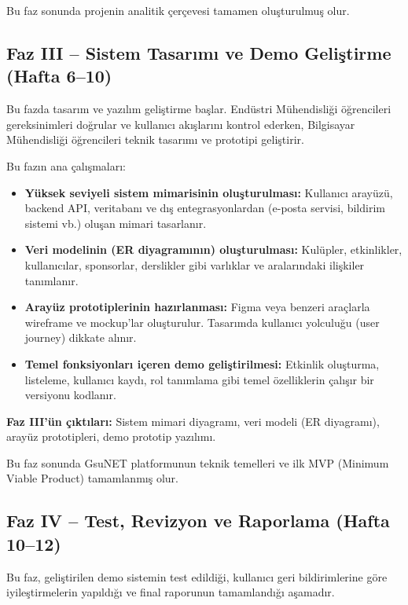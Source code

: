 \documentclass[a4paper,12pt]{report}
\begin{document}
Bu faz sonunda projenin analitik çerçevesi tamamen oluşturulmuş olur.

\subsection{Faz III – Sistem Tasarımı ve Demo Geliştirme (Hafta 6–10)}

Bu fazda tasarım ve yazılım geliştirme başlar. Endüstri Mühendisliği öğrencileri gereksinimleri doğrular ve kullanıcı akışlarını kontrol ederken, Bilgisayar Mühendisliği öğrencileri teknik tasarımı ve prototipi geliştirir.

Bu fazın ana çalışmaları:

\begin{itemize}
    \item \textbf{Yüksek seviyeli sistem mimarisinin oluşturulması:} Kullanıcı arayüzü, backend API, veritabanı ve dış entegrasyonlardan (e-posta servisi, bildirim sistemi vb.) oluşan mimari tasarlanır.

    \item \textbf{Veri modelinin (ER diyagramının) oluşturulması:} Kulüpler, etkinlikler, kullanıcılar, sponsorlar, derslikler gibi varlıklar ve aralarındaki ilişkiler tanımlanır.

    \item \textbf{Arayüz prototiplerinin hazırlanması:} Figma veya benzeri araçlarla wireframe ve mockup'lar oluşturulur. Tasarımda kullanıcı yolculuğu (user journey) dikkate alınır.

    \item \textbf{Temel fonksiyonları içeren demo geliştirilmesi:} Etkinlik oluşturma, listeleme, kullanıcı kaydı, rol tanımlama gibi temel özelliklerin çalışır bir versiyonu kodlanır.
\end{itemize}

\textbf{Faz III'ün çıktıları:} Sistem mimari diyagramı, veri modeli (ER diyagramı), arayüz prototipleri, demo prototip yazılımı.

Bu faz sonunda GsuNET platformunun teknik temelleri ve ilk MVP (Minimum Viable Product) tamamlanmış olur.

\subsection{Faz IV – Test, Revizyon ve Raporlama (Hafta 10–12)}

Bu faz, geliştirilen demo sistemin test edildiği, kullanıcı geri bildirimlerine göre iyileştirmelerin yapıldığı ve final raporunun tamamlandığı aşamadır.
\end{document}
